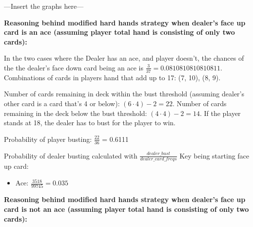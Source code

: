 \documentclass{article}
\begin{document}
        ---Insert the graphs here---

        \vspace{0.25cm}

        \hspace{-0.5cm}\textbf{Reasoning behind modified hard hands strategy when dealer's face up card is an ace (assuming player total hand is consisting of only two cards):}

        \vspace{0.25cm}

        \hspace{-0.5cm}In the two cases where the Dealer has an ace, and player doesn't, the chances of the the dealer's face down card being an ace is $\frac{3}{37} = 0.0810810810810811$. Combinations of cards in players hand that add up to 17: (7, 10), (8, 9).

        \vspace{0.25cm}
        
        \hspace{-0.5cm}Number of cards remaining in deck within the bust threshold (assuming dealer's other card is a card that's 4 or below): $(6 \cdot 4) - 2 = 22$. Number of cards remaining in the deck below the bust threshold: $(4 \cdot 4) - 2 = 14$. If the player stands at 18, the dealer has to bust for the player to win.
        
        \vspace{0.25cm}
        
        \hspace{-0.5cm}Probability of player busting: $\frac{22}{36}$ = 0.6111

        \vspace{0.25cm}

        \hspace{-0.5cm}Probability of dealer busting calculated with $\frac{dealer\_bust}{dealer\_card\_freqs}$ Key being starting face up card:
        \begin{itemize}
            \item Ace: $\frac{3518}{99745} = 0.035$
        \end{itemize}

        \vspace{0.5cm}

        \hspace{-0.5cm}\textbf{Reasoning behind modified hard hands strategy when dealer's face up card is not an ace (assuming player total hand is consisting of only two cards):}
\end{document}

